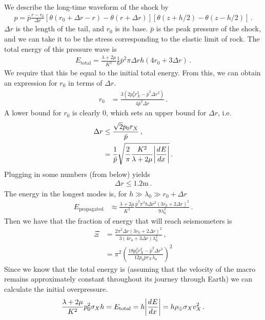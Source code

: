 \documentclass{article}
\newcommand*\te[1]{\text{#1}}
\newcommand*\p[1]{\left(#1\right)}
\newcommand*\ps[1]{\left[#1\right]}
\newcommand*\f[2]{\frac{#1}{#2}}
\newcommand*\td[3]{\frac{d^{#3}#1}{d #2^{#3}}}
\begin{document}
\\\\
We describe the long-time waveform of the shock by
\begin{align}
p=\bar p\f{r-r_0}{\Delta r}\ps{\theta(r_0+\Delta r-r)-\theta(r+\Delta r)}\ps{\theta(z+h/2)-\theta(z-h/2)}\,.
\end{align}
$\Delta r$ is the length of the tail, and $r_0$ is its base. $\bar p$ is the peak pressure of the shock, and we can take it to be the stress corresponding to the elastic limit of rock. The total energy of this pressure wave is
\begin{align}
E_{\te{total}}=\f{\lambda+2\mu}{K^2}\f16 \bar p^2 \pi\Delta r h(4 r_0+3\Delta r)\,.
\end{align}
We require that this be equal to the initial total energy. From this, we can obtain an expression for $r_0$ in terms of $\Delta r$.
\begin{align}
r_0&=\f{3(2p_0^2r_X^2-\bar p^2\Delta r^2)}{4\bar p^2\Delta r}\,.
\end{align}
A lower bound for $r_0$ is clearly 0, which sets an upper bound for $\Delta r$, i.e.
\begin{align}
\Delta r&\leq \f{\sqrt{2}p_0r_X}{\bar p}\,,\\
&=\f{1}{\bar p}\sqrt{\f{2}{\pi}\f{K^2}{\lambda+2\mu}\abs{\td{E}{x}{}}}\,.
\end{align}
Plugging in some numbers (from below) yields
\begin{align}
\Delta r\leq 1.2\te{m}\,.
\end{align}
The energy in the longest modes is, for $h\gg\lambda_0\gg r_0+\Delta r$
\begin{align}
E_{\te{propagated}}&\approx\f{\lambda+2\mu}{K^2}\f{\bar p^2 \pi^3 h \Delta r^2(3r_0+2\Delta r)^2}{9\lambda_0^2}\,.
\end{align}
Then we have that the fraction of energy that will reach seismometers is
\begin{align}
\Xi&=\f{2\pi^2\Delta r(3r_0+2\Delta r)^2}{3(4 r_0+3\Delta r)\lambda_0^2}\,,\\
&=\pi^2\p{\f{18 p_0^2 r_X^2-\bar p^2\Delta r^2}{12 p_0\bar p r_X\lambda_0}}^2
\end{align}
Since we know that the total energy is (assuming that the velocity of the macro remains approximately constant throughout its journey through Earth) we can calculate the initial overpressure.
\begin{align}
\f{\lambda+2\mu}{K^2}p_0^2\sigma_Xh=E_{\te{total}}=h\abs{\td{E}{x}{}}=h\rho_{\oplus}\sigma_Xv_X^2\,.
\end{align}
\end{document}
